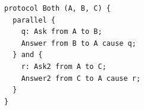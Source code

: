 \begin{lstlisting}[language={},basicstyle=\ttfamily\footnotesize,breaklines=true]
protocol Both (A, B, C) {
  parallel {
    q: Ask from A to B;
    Answer from B to A cause q;
  } and {
    r: Ask2 from A to C;
    Answer2 from C to A cause r;
  }
}
\end{lstlisting}
